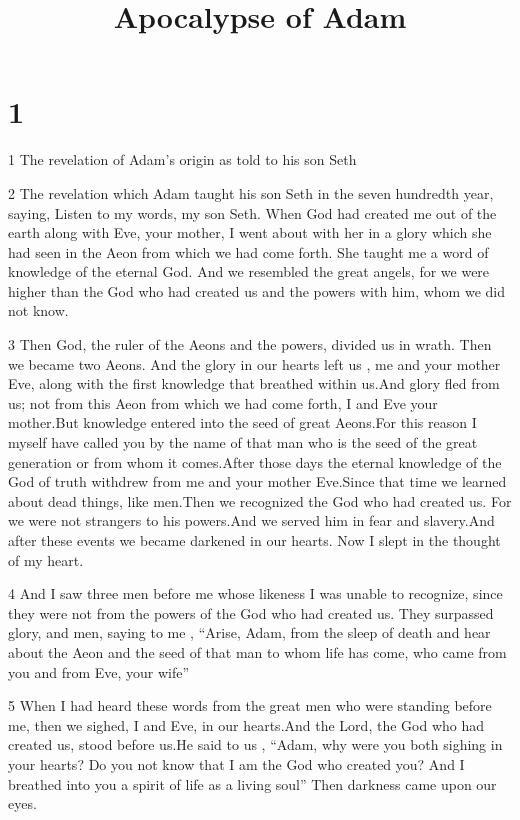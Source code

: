 

\title{Apocalypse of Adam}

\chapter{1}

\par 1 The revelation of Adam's origin as told to his son Seth

\par 2 The revelation which Adam taught his son Seth in the seven hundredth year, saying, Listen to my words, my son Seth. When God had created me out of the earth along with Eve, your mother, I went about with her in a glory which she had seen in the Aeon from which we had come forth. She taught me a word of knowledge of the eternal God. And we resembled the great angels, for we were higher than the God who had created us and the powers with him, whom we did not know.

\par 3 Then God, the ruler of the Aeons and the powers, divided us in wrath. Then we became two Aeons. And the glory in our hearts left us , me and your mother Eve, along with the first knowledge that breathed within us.And glory fled from us; not from this Aeon from which we had come forth, I and Eve your mother.But knowledge entered into the seed of great Aeons.For this reason I myself have called you by the name of that man who is the seed of the great generation or from whom it comes.After those days the eternal knowledge of the God of truth withdrew from me and your mother Eve.Since that time we learned about dead things, like men.Then we recognized the God who had created us. For we were not strangers to his powers.And we served him in fear and slavery.And after these events we became darkened in our hearts. Now I slept in the thought of my heart.

\par 4 And I saw three men before me whose likeness I was unable to recognize, since they were not from the powers of the God who had created us. They surpassed glory, and men, saying to me , “Arise, Adam, from the sleep of death and hear about the Aeon and the seed of that man to whom life has come, who came from you and from Eve, your wife”

\par 5 When I had heard these words from the great men who were standing before me, then we sighed, I and Eve, in our hearts.And the Lord, the God who had created us, stood before us.He said to us , “Adam, why were you both sighing in your hearts? Do you not know that I am the God who created you? And I breathed into you a spirit of life as a living soul” Then darkness came upon our eyes.

